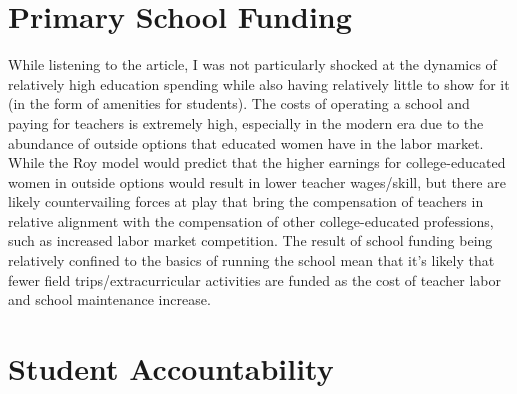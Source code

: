 \documentclass[10pt]{extarticle}
\title{}
\author{}
\date{}
\begin{document}
  \section{Primary School Funding}%
  While listening to the article, I was not particularly shocked at the dynamics of relatively high education spending while also having relatively little to show for it (in the form of amenities for students). The costs of operating a school and paying for teachers is extremely high, especially in the modern era due to the abundance of outside options that educated women have in the labor market. While the Roy model would predict that the higher earnings for college-educated women in outside options would result in lower teacher wages/skill, but there are likely countervailing forces at play that bring the compensation of teachers in relative alignment with the compensation of other college-educated professions, such as increased labor market competition. The result of school funding being relatively confined to the basics of running the school mean that it's likely that fewer field trips/extracurricular activities are funded as the cost of teacher labor and school maintenance increase.
  \section{Student Accountability}%
\end{document}
